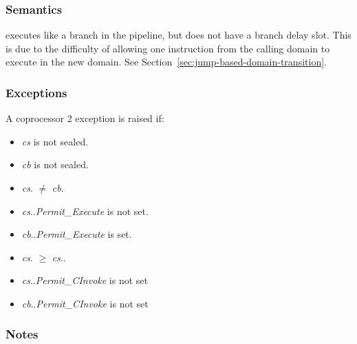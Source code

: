 \subsubsection*{Semantics}


\noindent
{}
 executes like a branch in the pipeline, but does
not have a branch delay slot. This is due to the difficulty of allowing one
instruction from the calling domain to execute in the new domain.
See Section~\ref{sec:jump-based-domain-transition}.
%

\subsubsection*{Exceptions}

A coprocessor 2 exception is raised if:

\begin{itemize}
\item
\emph{cs} is not sealed.
\item
\emph{cb} is not sealed.
\item
\emph{cs}.\cotype{} $\ne$ \emph{cb}.\cotype{}
\item
\emph{cs}.\cperms{}.\emph{Permit\_Execute} is not set.
\item
\emph{cb}.\cperms{}.\emph{Permit\_Execute} is set.
\item
\emph{cs}.\coffset{} $\ge$ \emph{cs}.\clength{}.
\item
\emph{cs}.\cperms{}.\emph{Permit\_CInvoke} is not set
\item
\emph{cb}.\cperms{}.\emph{Permit\_CInvoke} is not set
\end{itemize}

\subsubsection*{Notes}

